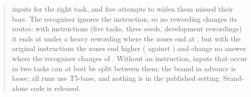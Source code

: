 \begin{abstract}
inputs for the right task, and five attempts to widen them missed their bars. The recogniser ignores the instruction, so no rewording changes its routes: with instructions (five tasks, three seeds, development rewordings) it ends at \AudUThreeHeavyRidgeAPOne{} under a heavy rewording where the zones end at \AudUThreeHeavyCertAPOne{}, but with the original instructions the zones end higher (\AudUThreeOriginalCertAPOne{} against \AudUThreeOriginalRidgeAPOne{}) and change no answer where the recogniser changes \AudUThreeOriginalRidgeChanged{} of \AudUThreeCompared{}. Without an instruction, inputs that occur in two tasks can at best be split between them; the bound in advance is loose; all runs use T5-base, and nothing is in the published setting. Stand-alone code is released.
\end{abstract}
